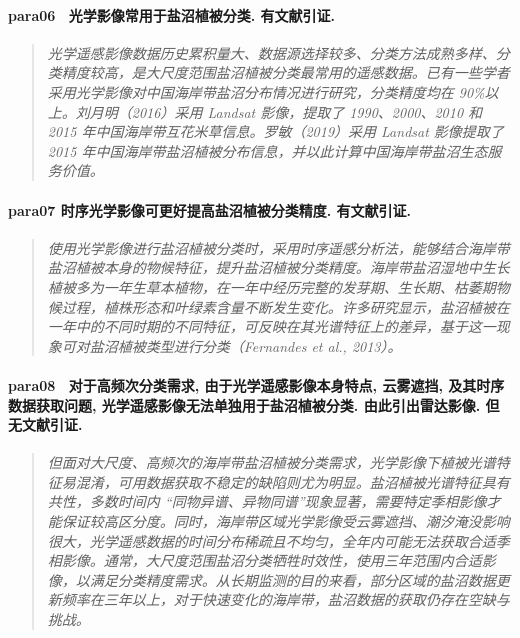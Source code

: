 \paragraph*{para06~
    \textcolor[RGB]{17, 205, 29}{光学影像常用于盐沼植被分类. 有文献引证.}}
\begin{quotation}
    \itshape
    光学遥感影像数据历史累积量大、数据源选择较多、分类方法成熟多样、分类精度较高，是大尺度范围盐沼植被分类最常用的遥感数据。已有一些学者采用光学影像对中国海岸带盐沼分布情况进行研究，分类精度均在 90\%以上。刘月明（2016）采用 Landsat 影像，提取了 1990、2000、2010 和 2015 年中国海岸带互花米草信息。罗敏（2019）采用 Landsat 影像提取了 2015 年中国海岸带盐沼植被分布信息，并以此计算中国海岸带盐沼生态服务价值。 
\end{quotation}

\paragraph*{para07
    \textcolor[RGB]{17, 205, 29}{时序光学影像可更好提高盐沼植被分类精度. 有文献引证.}}
\begin{quotation}
    \itshape
    使用光学影像进行盐沼植被分类时，采用时序遥感分析法，能够结合海岸带盐沼植被本身的物候特征，提升盐沼植被分类精度。海岸带盐沼湿地中生长植被多为一年生草本植物，在一年中经历完整的发芽期、生长期、枯萎期物候过程，植株形态和叶绿素含量不断发生变化。许多研究显示，盐沼植被在一年中的不同时期的不同特征，可反映在其光谱特征上的差异，基于这一现象可对盐沼植被类型进行分类（Fernandes et al., 2013）。 
\end{quotation}

\paragraph*{para08~
    \textcolor[RGB]{17, 205, 29}{对于高频次分类需求, 由于光学遥感影像本身特点, 云雾遮挡, 及其时序数据获取问题, 光学遥感影像无法单独用于盐沼植被分类. 由此引出雷达影像. 但无文献引证.}}
\begin{quotation}
    \itshape
    但面对大尺度、高频次的海岸带盐沼植被分类需求，光学影像下植被光谱特征易混淆，可用数据获取不稳定的缺陷则尤为明显。盐沼植被光谱特征具有共性，多数时间内  “同物异谱、异物同谱”现象显著，需要特定季相影像才能保证较高区分度。同时，海岸带区域光学影像受云雾遮挡、潮汐淹没影响很大，光学遥感数据的时间分布稀疏且不均匀，全年内可能无法获取合适季相影像。通常，大尺度范围盐沼分类牺牲时效性，使用三年范围内合适影像，以满足分类精度需求。从长期监测的目的来看，部分区域的盐沼数据更新频率在三年以上，对于快速变化的海岸带，盐沼数据的获取仍存在空缺与挑战。
\end{quotation}

